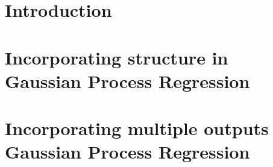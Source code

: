 \documentclass[a4paper,12pt]{book}
\begin{document}




\frontmatter



\clearpage
\tableofcontents

\clearpage
\listoffigures

\clearpage



\mainmatter
\pagestyle{fancy}

\cleardoublepage

\part{Introduction}\label{partIntroduction}




\part{Incorporating structure in Gaussian Process Regression}\label{partIncorporatePattern}



\part{Incorporating multiple outputs Gaussian Process Regression}\label{partIncorporateMultipleOutputs}



\appendix
%




\clearpage


\cleardoublepage

\end{document}
